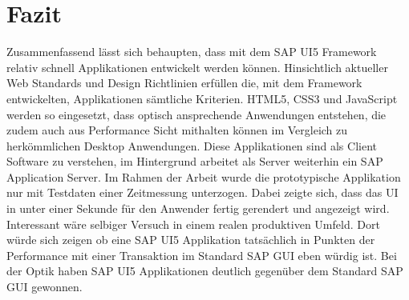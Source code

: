 \section{Fazit}\label{fazit}
Zusammenfassend lässt sich behaupten, dass mit dem SAP UI5 Framework relativ schnell Applikationen entwickelt werden können. Hinsichtlich aktueller Web Standards und Design Richtlinien erfüllen die, mit dem Framework entwickelten, Applikationen sämtliche Kriterien. HTML5, CSS3 und JavaScript werden so eingesetzt, dass optisch ansprechende Anwendungen entstehen, die zudem auch aus Performance Sicht mithalten können im Vergleich zu herkömmlichen Desktop Anwendungen. Diese Applikationen sind als Client Software zu verstehen, im Hintergrund arbeitet als Server weiterhin ein SAP Application Server. Im Rahmen der Arbeit wurde die prototypische Applikation nur mit Testdaten einer Zeitmessung unterzogen. Dabei zeigte sich, dass das UI in unter einer Sekunde für den Anwender fertig gerendert und angezeigt wird. Interessant wäre selbiger Versuch in einem realen produktiven Umfeld. Dort würde sich zeigen ob eine SAP UI5 Applikation tatsächlich in Punkten der Performance mit einer Transaktion im Standard SAP GUI eben würdig ist. Bei der Optik haben SAP UI5 Applikationen deutlich gegenüber dem Standard SAP GUI gewonnen.